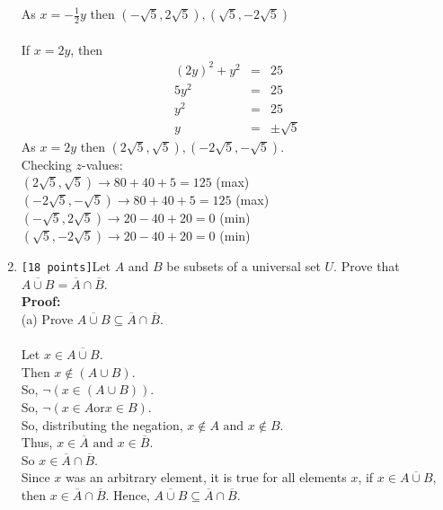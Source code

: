 \documentclass[10pt]{article}
\begin{document}
\begin{enumerate}
    As $x = -\frac{1}{2}y $ then $(-\sqrt{5},2\sqrt{5}),(\sqrt{5},-2\sqrt{5})$\\
    \\
    If $x = 2y$, then
    \begin{eqnarray*}
        (2y)^2 + y^2 & = & 25 \\
        5y^2 & = & 25 \\
        y^2 & = & 25 \\
        y & = & \pm\sqrt{5}
    \end{eqnarray*}
    As $x = 2y$ then $(2\sqrt{5},\sqrt{5}),(-2\sqrt{5},-\sqrt{5})$. \\
    Checking $z$-values: \\
    $(2\sqrt{5},\sqrt{5}) \rightarrow 80 + 40 + 5 = 125$ (max) \\
    $(-2\sqrt{5},-\sqrt{5}) \rightarrow 80 + 40 + 5 = 125$ (max) \\
    $(-\sqrt{5},2\sqrt{5}) \rightarrow 20 - 40 + 20 = 0$ (min) \\
    $(\sqrt{5},-2\sqrt{5}) \rightarrow 20 - 40 + 20 = 0$ (min) \\

    \newpage

\item \verb![18 points]!Let $A$ and $B$ be subsets of a universal set $U$. Prove that $\overline{A\cup B} = \overline{A}\cap \overline{B}$. \\
    \textbf{Proof:} \\
    (a) Prove $ \overline{A\cup B}\subseteq\overline{A}\cap\overline{B}$. \\
    \\
    Let $x\in\overline{A\cup B}$. \\
    Then $x\notin(A\cup B)$. \\
    So, $\neg(x\in(A\cup B))$. \\
    So, $\neg(x\in A \text{or} x\in B)$. \\
    So, distributing the negation, $x\notin A \text{ and }x\notin B$. \\
    Thus, $x\in\overline{A} \text{ and } x\in\overline{B}$. \\
    So $x\in\overline{A}\cap\overline{B}$. \\
    Since $x$ was an arbitrary element, it is true for all elements $x$, if $x\in\overline{A\cup B}$, then $x\in\overline{A}\cap\overline{B}$. Hence, $\overline{A\cup B}\subseteq\overline{A}\cap\overline{B}$. \\


\end{enumerate}
\end{document}

